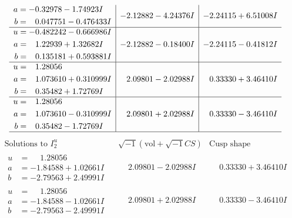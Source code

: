 \documentclass[1p]{elsarticle_modified}
\theoremstyle{definition}
\newcommand{\I}{\sqrt{-1}}
\begin{document}
$$\begin{array}{c|c|c}
\begin{aligned}
a &= -0.32978 - 1.74923 I \\
b &= \phantom{-}0.047751 - 0.476433 I\end{aligned}
 & -2.12882 - 4.24376 I & -2.24115 + 6.51008 I \\ \hline\begin{aligned}
u &= -0.482242 - 0.666986 I \\
a &= \phantom{-}1.22939 + 1.32682 I \\
b &= \phantom{-}0.135181 + 0.593881 I\end{aligned}
 & -2.12882 - 0.18400 I & -2.24115 - 0.41812 I \\ \hline\begin{aligned}
u &= \phantom{-}1.28056\phantom{ +0.000000I} \\
a &= \phantom{-}1.073610 + 0.310999 I \\
b &= \phantom{-}0.35482 + 1.72769 I\end{aligned}
 & \phantom{-}2.09801 - 2.02988 I & \phantom{-}0.33330 + 3.46410 I \\ \hline\begin{aligned}
u &= \phantom{-}1.28056\phantom{ +0.000000I} \\
a &= \phantom{-}1.073610 - 0.310999 I \\
b &= \phantom{-}0.35482 - 1.72769 I\end{aligned}
 & \phantom{-}2.09801 + 2.02988 I & \phantom{-}0.33330 - 3.46410 I\\
 \hline 
 \end{array}$$\newpage$$\begin{array}{c|c|c}  
\text{Solutions to }I^u_{2}& \I (\text{vol} + \sqrt{-1}CS) & \text{Cusp shape}\\
 \hline 
\begin{aligned}
u &= \phantom{-}1.28056\phantom{ +0.000000I} \\
a &= -1.84588 + 1.02661 I \\
b &= -2.79563 + 2.49991 I\end{aligned}
 & \phantom{-}2.09801 - 2.02988 I & \phantom{-}0.33330 + 3.46410 I \\ \hline\begin{aligned}
u &= \phantom{-}1.28056\phantom{ +0.000000I} \\
a &= -1.84588 - 1.02661 I \\
b &= -2.79563 - 2.49991 I\end{aligned}
 & \phantom{-}2.09801 + 2.02988 I & \phantom{-}0.33330 - 3.46410 I \\ \hline\begin{aligned}

\end{aligned}
\end{array}$$
\end{document}

